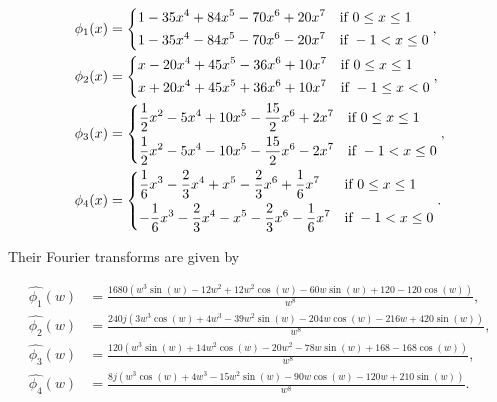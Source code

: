 \documentclass[a4paper, 11pt]{article}
\begin{document}
\begin{align*}
  \phi_1(x) &= \begin{dcases} 
    1 - 35 x^4 + 84 x^5 - 70 x^6 + 20x^7 & \text{if } 0 \leq x \leq 1  \\
    1 - 35 x^4 - 84 x^5 - 70 x^6 - 20x^7 & \text{if } - 1 < x \leq 0  \\
  \end{dcases}, \\
  \phi_2(x) &= \begin{dcases}
    x - 20 x^4 + 45 x^5 - 36 x^6 + 10x^7 & \text{if } 0 \leq x \leq 1  \\
    x + 20 x^4 + 45 x^5 + 36 x^6 + 10x^7 & \text{if } -1 \leq x < 0 \\
  \end{dcases}, \\
  \phi_3(x) &= \begin{dcases}
    \frac{1}{2} x^2 - 5 x^4 + 10 x^5 - \frac{15}{2} x^6 + 2x^7 & \text{if } 0 \leq x \leq 1  \\
    \frac{1}{2} x^2 - 5 x^4 - 10 x^5 - \frac{15}{2} x^6 - 2x^7 & \text{if } -1 < x \leq 0  \\
  \end{dcases}, \\
  \phi_4(x) &= \begin{dcases}
    \frac{1}{6} x^3 - \frac{2}{3} x^4 + x^5 - \frac{2}{3} x^6 + \frac{1}{6} x^7 & \text{if } 0 \leq x \leq 1  \\
    -\frac{1}{6} x^3 - \frac{2}{3} x^4 - x^5 - \frac{2}{3} x^6 - \frac{1}{6} x^7 & \text{if } -1 < x \leq 0  \\
  \end{dcases}.
\end{align*}

Their Fourier transforms are given by

\begin{align*}
  \hat{\phi_1}(w) &= \frac{1680(w^3 \sin(w) - 12w^2 +  12w^2 \cos(w) - 60 w\sin(w) + 120  - 120 \cos(w))}{w^8}, \\
  \hat{\phi_2}(w)&=\frac{240 j \left( 3w^3\cos(w) + 4w^3 - 39w^2\sin(w) - 204 w\cos(w) - 216w +  420 
  \sin(w)\right)}{w^8}, \\
  \hat{\phi_3}(w)&=\frac{120 \left(w^3 \sin(w) + 14w^2 \cos(w) - 20w^2 - 78w\sin(w) + 168 - 168\cos(w)\right)}{w^8}, \\
  \hat{\phi_4}(w)&=\frac{8 j \left(w^3 \cos(w) + 4w^3 - 15w^2\sin(w) - 90w\cos(w) - 120w + 210 \sin(w) \right)}{w^8}.
\end{align*}
\end{document}
